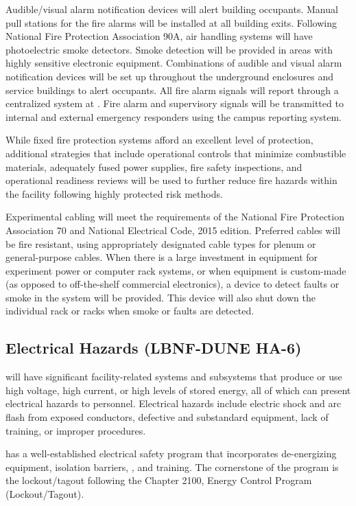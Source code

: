 Audible/visual alarm notification devices will alert building
occupants.  Manual pull stations for the fire alarms will be installed
at all building exits.  Following National Fire Protection Association
90A, air handling systems will have photoelectric smoke detectors.
Smoke detection will be provided in areas with highly sensitive
electronic equipment.  Combinations of audible and visual alarm
notification devices will be set up throughout the underground
enclosures and service buildings to alert occupants. All fire alarm
signals will report through a centralized system at .
Fire alarm and supervisory signals will be transmitted to internal and
external emergency responders using the campus reporting system.

While fixed fire protection systems afford an excellent level
of protection, additional strategies that include operational controls
that minimize combustible materials, adequately
fused power supplies, fire safety inspections, and operational
readiness reviews will be used to further reduce fire hazards
within the facility following  highly protected risk methods.

Experimental cabling will meet the requirements of the National Fire
Protection Association 70 and National Electrical Code, 2015 edition.
Preferred cables will be fire resistant, using appropriately
designated cable types for plenum or general-purpose cables.  When
there is a large investment in equipment for experiment power or
computer rack systems, or when equipment is custom-made (as opposed to
off-the-shelf commercial electronics), a device to detect faults or
smoke in the system will be provided.  This device will also shut
down the individual rack or racks when smoke or faults are detected. 


\subsection{Electrical Hazards (LBNF-DUNE HA-6)}

 will have significant facility-related
systems and subsystems that produce or use high voltage, high current,
or high levels of stored energy, all of which can present electrical
hazards to personnel. Electrical hazards include electric shock and
arc flash from exposed conductors, defective and substandard
equipment, lack of training, or improper procedures.

\fnal has a well-established electrical safety program that
incorporates de-energizing equipment, isolation barriers, , 
and training. The cornerstone of the program is
the lockout/tagout following the  Chapter 2100, \fnal
Energy Control Program (Lockout/Tagout).

